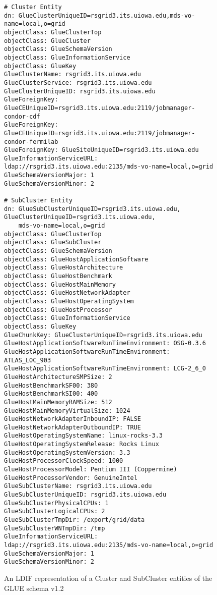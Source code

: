 \documentclass[12pt]{article}
\begin{document}
\begin{figure}
\scriptsize
\begin{verbatim}# Cluster Entity
dn: GlueClusterUniqueID=rsgrid3.its.uiowa.edu,mds-vo-name=local,o=grid
objectClass: GlueClusterTop
objectClass: GlueCluster
objectClass: GlueSchemaVersion
objectClass: GlueInformationService
objectClass: GlueKey
GlueClusterName: rsgrid3.its.uiowa.edu
GlueClusterService: rsgrid3.its.uiowa.edu
GlueClusterUniqueID: rsgrid3.its.uiowa.edu
GlueForeignKey: GlueCEUniqueID=rsgrid3.its.uiowa.edu:2119/jobmanager-condor-cdf
GlueForeignKey: GlueCEUniqueID=rsgrid3.its.uiowa.edu:2119/jobmanager-condor-fermilab
GlueForeignKey: GlueSiteUniqueID=rsgrid3.its.uiowa.edu
GlueInformationServiceURL: ldap://rsgrid3.its.uiowa.edu:2135/mds-vo-name=local,o=grid
GlueSchemaVersionMajor: 1
GlueSchemaVersionMinor: 2

# SubCluster Entity
dn: GlueSubClusterUniqueID=rsgrid3.its.uiowa.edu, GlueClusterUniqueID=rsgrid3.its.uiowa.edu,
    mds-vo-name=local,o=grid
objectClass: GlueClusterTop
objectClass: GlueSubCluster
objectClass: GlueSchemaVersion
objectClass: GlueHostApplicationSoftware
objectClass: GlueHostArchitecture
objectClass: GlueHostBenchmark
objectClass: GlueHostMainMemory
objectClass: GlueHostNetworkAdapter
objectClass: GlueHostOperatingSystem
objectClass: GlueHostProcessor
objectClass: GlueInformationService
objectClass: GlueKey
GlueChunkKey: GlueClusterUniqueID=rsgrid3.its.uiowa.edu
GlueHostApplicationSoftwareRunTimeEnvironment: OSG-0.3.6
GlueHostApplicationSoftwareRunTimeEnvironment: ATLAS_LOC_903
GlueHostApplicationSoftwareRunTimeEnvironment: LCG-2_6_0
GlueHostArchitectureSMPSize: 2
GlueHostBenchmarkSF00: 380
GlueHostBenchmarkSI00: 400
GlueHostMainMemoryRAMSize: 512
GlueHostMainMemoryVirtualSize: 1024
GlueHostNetworkAdapterInboundIP: FALSE
GlueHostNetworkAdapterOutboundIP: TRUE
GlueHostOperatingSystemName: linux-rocks-3.3
GlueHostOperatingSystemRelease: Rocks Linux
GlueHostOperatingSystemVersion: 3.3
GlueHostProcessorClockSpeed: 1000
GlueHostProcessorModel: Pentium III (Coppermine)
GlueHostProcessorVendor: GenuineIntel
GlueSubClusterName: rsgrid3.its.uiowa.edu
GlueSubClusterUniqueID: rsgrid3.its.uiowa.edu
GlueSubClusterPhysicalCPUs: 1
GlueSubClusterLogicalCPUs: 2
GlueSubClusterTmpDir: /export/grid/data
GlueSubClusterWNTmpDir: /tmp
GlueInformationServiceURL: ldap://rsgrid3.its.uiowa.edu:2135/mds-vo-name=local,o=grid
GlueSchemaVersionMajor: 1
GlueSchemaVersionMinor: 2
\end{verbatim}
\normalsize
\caption[LDIF Representation of another CE Entity]{
\label{LDIF-Cluster-Subcluster-Example} An LDIF representation
of a Cluster and SubCluster entities of the GLUE schema v1.2}
\end{figure}
\end{document}
